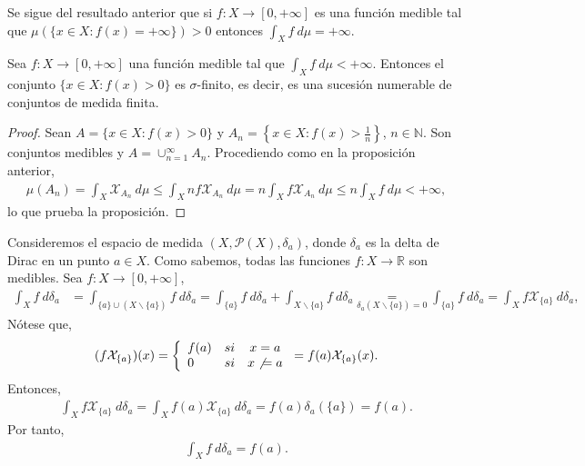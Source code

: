 \begin{obs}
Se sigue del resultado anterior que si $f: X \longrightarrow [0,+\infty]$ es una función medible tal que $\mu(\{ x \in X : f(x) = +\infty\}) > 0$ entonces $\int_{X}{f \ d\mu} = +\infty$.
\end{obs}

\begin{prop}
Sea $f: X \longrightarrow [0,+\infty]$ una función medible tal que $\int_{X}{f \ d\mu} < +\infty$. Entonces el conjunto $\{x \in X : f(x) > 0\}$ es $\sigma$-finito, es decir, es una sucesión numerable de conjuntos de medida finita.
\end{prop}

\begin{proof}
Sean $A = \{x \in X : f(x) >0\}$ y $A_n = \left\{ x \in X : f(x) > \frac{1}{n}\right\}$, $n \in \mathbb{N}$. Son conjuntos medibles y $A = \cup_{n=1}^{\infty}{A_n}$. Procediendo como en la proposición anterior,
\begin{align*}
    \mu(A_n) = \int_{X}{\mathcal{X}_{A_n} \ d\mu} \leq \int_{X}{nf\mathcal{X}_{A_n} \ d\mu} = n\int_{X}{f\mathcal{X}_{A_n} \ d\mu} \leq n\int_{X}{f \ d\mu} < +\infty,
\end{align*}
lo que prueba la proposición.
\end{proof}

\begin{ejemplo}
Consideremos el espacio de medida $(X,\mathcal{P}(X),\delta_a)$, donde $\delta_a$ es la delta de Dirac en un punto $a \in X$. Como sabemos, todas las funciones $f: X \longrightarrow \mathbb{R}$ son medibles. Sea $f: X \longrightarrow [0,+\infty]$,
\begin{align*}
    \int_{X}{f \ d\delta_a} &= \int_{\{a\}\cup(X \backslash \{a\})}{f \ d\delta_a} = \int_{\{a\}}{f \ d\delta_a} + \int_{X \backslash \{a\}}{f \ d\delta_a} \underset{\delta_a{(X \backslash \{a\}) = 0}}{=} \int_{\{a\}}{f \ d\delta_a} = \int_{X}{f\mathcal{X}_{\{a\}} \ d\delta_a},
\end{align*}
Nótese que,
\begin{align*}
    (f\mathcal{X}_{\{a\}})(x) = \left\{ \begin{array}{lcc}
             f(a) &  si  &x = a\\
             0 &  si  &x \not \ = a \\
             \end{array}
        \right.
        = f(a)\mathcal{X}_{\{a\}}(x).
\end{align*}
Entonces,
\begin{align*}
    \int_{X}{f\mathcal{X}_{\{a\}} \ d\delta_a} = \int_{X}{f(a)\mathcal{X}_{\{a\}} \ d\delta_a} = f(a)\delta_a(\{a\}) = f(a).
\end{align*}
Por tanto,
\begin{align*}
    \int_{X}{f \ d\delta_a} = f(a).
\end{align*}
\end{ejemplo}

